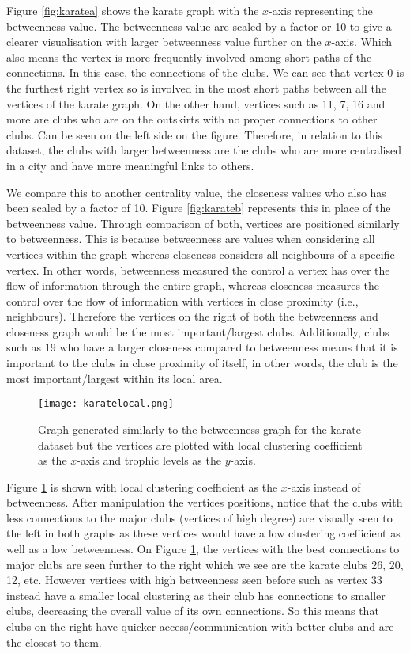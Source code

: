 Figure \ref{fig:karatea} shows the karate graph with the $x$-axis representing the betweenness value. The betweenness value are scaled by a factor or 10 to give a clearer visualisation with larger betweenness value further on the $x$-axis. Which also means the vertex is more frequently involved among short paths of the connections. In this case, the connections of the clubs. We can see that vertex 0 is the furthest right vertex so is involved in the most short paths between all the vertices of the karate graph. On the other hand, vertices such as 11, 7, 16 and more are clubs who are on the outskirts with no proper connections to other clubs. Can be seen on the left side on the figure. Therefore, in relation to this dataset, the clubs with larger betweenness are the clubs who are more centralised in a city and have more meaningful links to others.

We compare this to another centrality value, the closeness values who also has been scaled by a factor of 10. Figure \ref{fig:karateb} represents this in place of the betweenness value. Through comparison of both, vertices are positioned similarly to betweenness. This is because betweenness are values when considering all vertices within the graph whereas closeness considers all neighbours of a specific vertex. In other words, betweenness measured the control a vertex has over the flow of information through the entire graph, whereas closeness measures the control over the flow of information with vertices in close proximity (i.e., neighbours). Therefore the vertices on the right of both the betweenness and closeness graph would be the most important/largest clubs. Additionally, clubs such as 19 who have a larger closeness compared to betweenness means that it is important to the clubs in close proximity of itself, in other words, the club is the most important/largest within its local area.

\begin{figure}[H]
	\centering
	\texttt{[image: karatelocal.png]}
	\caption{Graph generated similarly to the betweenness graph for the karate dataset but the vertices are plotted with local clustering coefficient as the $x$-axis and trophic levels as the $y$-axis.}
	\label{fig:karatelocal}
\end{figure}


Figure \ref{fig:karatelocal} is shown with local clustering coefficient as the $x$-axis instead of betweenness. After manipulation the vertices positions, notice that the clubs with less connections to the major clubs (vertices of high degree) are visually seen to the left in both graphs as these vertices would have a low clustering coefficient as well as a low betweenness. On Figure \ref{fig:karatelocal}, the vertices with the best connections to major clubs are seen further to the right which we see are the karate clubs 26, 20, 12, etc. However vertices with high betweenness seen before such as vertex 33 instead have a smaller local clustering as their club has connections to smaller clubs, decreasing the overall value of its own connections. So this means that clubs on the right have quicker access/communication with better clubs and are the closest to them.

